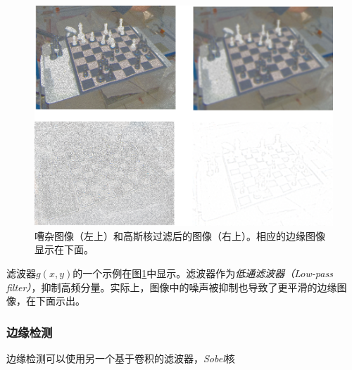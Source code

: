 \begin{figure}
	\centering
		\includegraphics[width=\textwidth]{figs/filters}
	\caption{嘈杂图像（左上）和高斯核过滤后的图像（右上）。相应的边缘图像显示在下面。
	\label{fig:filters}}
\end{figure}


滤波器$g(x,y)$的一个示例在图\ref{fig:filters}中显示。滤波器作为\emph{低通滤波器（Low-pass filter）}，抑制高频分量。实际上，图像中的噪声被抑制也导致了更平滑的边缘图像，在下面示出。



\subsubsection{边缘检测}
\label{sec:sobel}
边缘检测可以使用另一个基于卷积的滤波器，\emph{Sobel}核

